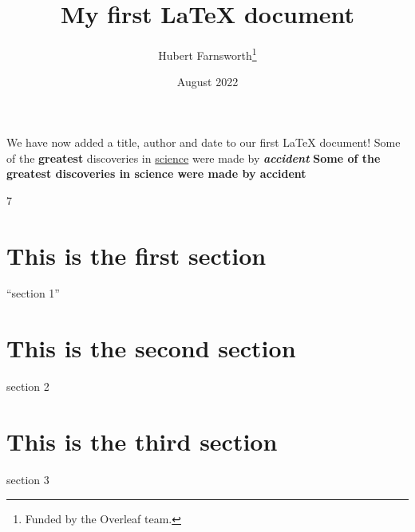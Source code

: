 \documentclass{article}
\title{My first LaTeX document}
\author{Hubert Farnsworth\thanks{Funded by the Overleaf team.}}
\date{August 2022}
\begin{document}
\maketitle
We have now added a title, author and date to our first \LaTeX{} document!
Some of the \textbf{greatest}
discoveries in \underline{science}
were made by \textbf{\textit{accident}}
\textbf{Some of the greatest discoveries in science were made by accident}

 7 
\section{This is the first section}
``section 1''

\section{This is the second section}
section 2

\newpage

\section{This is the third section}
section 3
\end{document}
